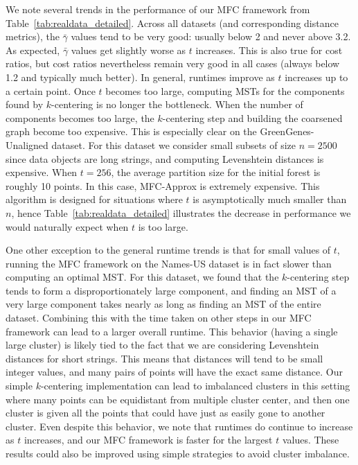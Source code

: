 We note several trends in the performance of our MFC framework from Table~\ref{tab:realdata_detailed}. Across all datasets (and corresponding distance metrics), the $\bar{\gamma}$ values tend to be very good: usually below 2 and never above 3.2. As expected, $\bar{\gamma}$ values get slightly worse as $t$ increases. This is also true for cost ratios, but cost ratios nevertheless remain very good in all cases (always below 1.2 and typically much better). In general, runtimes improve as $t$ increases up to a certain point. Once $t$ becomes too large, computing MSTs for the components found by $k$-centering is no longer the bottleneck. When the number of components becomes too large, the $k$-centering step and building the coarsened graph become too expensive. This is especially clear on the GreenGenes-Unaligned dataset. For this dataset we consider small subsets of size $n = 2500$ since data objects are long strings, and computing Levenshtein distances is expensive. When $t = 256$, the average partition size for the initial forest is roughly 10 points. In this case, \textsf{MFC-Approx} is extremely expensive. This algorithm is designed for situations where $t$ is asymptotically much smaller than $n$, hence Table~\ref{tab:realdata_detailed} illustrates the decrease in performance we would naturally expect when $t$ is too large.

One other exception to the general runtime trends is that for small values of $t$, running the MFC framework on the Names-US dataset is in fact slower than computing an optimal MST. For this dataset, we found that the $k$-centering step tends to form a disproportionately large component, and finding an MST of a very large component takes nearly as long as finding an MST of the entire dataset.
Combining this with the time taken on other steps in our MFC framework can lead to a larger overall runtime. This behavior (having a single large cluster) is likely tied to the fact that we are considering Levenshtein distances for short strings. This means that distances will tend to be small integer values, and many pairs of points will have the exact same distance. Our simple $k$-centering implementation can lead to imbalanced clusters in this setting where many points can be equidistant from multiple cluster center, and then one cluster is given all the points that could have just as easily gone to another cluster. Even despite this behavior, we note that runtimes do continue to increase as $t$ increases, and our MFC framework is faster for the largest $t$ values. These results could also be improved using simple strategies to avoid cluster imbalance.